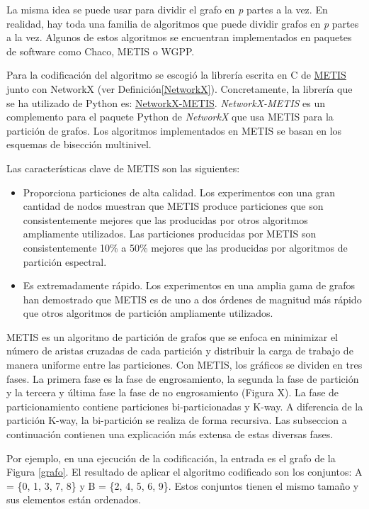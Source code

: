 La misma idea se puede usar para dividir el grafo en \textit{p} partes a la vez. En realidad, hay toda una familia de algoritmos que puede dividir grafos en \textit{p} partes a la vez. Algunos de estos algoritmos se encuentran implementados en paquetes de software como Chaco\cite{Chaco}, METIS\cite{MeTis} o WGPP\cite{WGPP}.

Para la codificación del algoritmo se escogió la librería escrita en C de \href{http://glaros.dtc.umn.edu/gkhome/metis/metis/overview}{METIS} junto con NetworkX (ver Definición\ref{NetworkX}). Concretamente, la librería que se ha utilizado de Python es: \href{https://networkx-metis.readthedocs.io/en/latest/reference/generated/nxmetis.partition.html#nxmetis.partition}{NetworkX-METIS}. \textit{NetworkX-METIS} es un complemento para el paquete Python de \textit{NetworkX} que usa METIS\cite{MeTis} para la partición de grafos. Los algoritmos implementados en METIS se basan en los esquemas de bisección multinivel.

Las características clave de METIS son las siguientes:

\begin{itemize}
	\item Proporciona particiones de alta calidad. Los experimentos con una gran cantidad de nodos muestran que METIS produce particiones que son consistentemente mejores que las producidas por otros algoritmos ampliamente utilizados. Las particiones producidas por METIS son consistentemente 10\% a 50\% mejores que las producidas por algoritmos de partición espectral.
	\item Es extremadamente rápido. Los experimentos en una amplia gama de grafos han demostrado que METIS es de uno a dos órdenes de magnitud más rápido que otros algoritmos de partición ampliamente utilizados.
\end{itemize}

METIS es un algoritmo de partición de grafos que se enfoca en minimizar el número de aristas cruzadas de cada partición y distribuir la carga de trabajo de manera uniforme entre las particiones. Con METIS, los gráficos se dividen en tres fases. La primera fase es la fase de engrosamiento, la segunda la fase de partición y la tercera y última fase la fase de no engrosamiento (Figura X). La fase de particionamiento contiene particiones bi-particionadas y K-way. A diferencia de la partición K-way, la bi-partición se realiza de forma recursiva. Las subseccion a continuación contienen una explicación más extensa de estas diversas fases.

Por ejemplo, en una ejecución de la codificación, la entrada es el grafo de la Figura \ref{grafo}. El resultado de aplicar el algoritmo codificado son los conjuntos: A = \{0, 1, 3, 7, 8\} y B = \{2, 4, 5, 6, 9\}. Estos conjuntos tienen el mismo tamaño y sus elementos están ordenados.